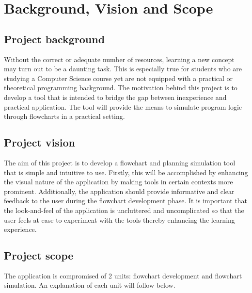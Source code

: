 \documentclass[12pt,a4paper,titlepage]{article}
\begin{document}


\newpage
\tableofcontents


\pagebreak

\section{Background, Vision and Scope}
\subsection{Project background}
Without the correct or adequate number of resources, learning a new concept may turn out to be a daunting task. This is especially true for students who are studying a Computer Science course yet are not equipped with a practical or theoretical programming background. The motivation behind this project is to develop a tool that is intended to bridge the  gap between inexperience and practical application. The tool will provide the means to simulate program logic through flowcharts in a practical setting. 

\subsection{Project vision}

The aim of this project is to develop a flowchart and planning simulation tool that is simple and intuitive to use. Firstly, this will be accomplished by enhancing the visual nature of the application by making tools in certain contexts more prominent. Additionally, the application should provide informative and clear feedback to the user during the flowchart development phase. It is important that the look-and-feel of the application is uncluttered and uncomplicated so that the user feels at ease to experiment with the tools thereby enhancing the learning experience.

\subsection{Project scope}

The application is compromised of 2 units: flowchart development and flowchart simulation. An explanation of each unit will follow below.
\end{document}
